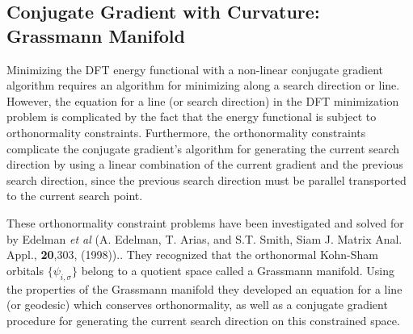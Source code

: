 \subsection{Conjugate Gradient with Curvature: Grassmann Manifold}
\label{sec:pspw_cgmanifold}

Minimizing the DFT energy functional with a non-linear conjugate 
gradient algorithm requires an algorithm for minimizing along a 
search direction or line.  However, the equation for a line 
(or search direction) in the DFT minimization problem is complicated 
by the fact that the energy functional is subject to orthonormality 
constraints. 
Furthermore, the orthonormality constraints complicate the
conjugate gradient's algorithm for generating the current search 
direction by using a linear combination of the current gradient and 
the previous search direction, since the previous search direction
must be parallel transported to the current search point.

These orthonormality constraint problems
have been investigated and solved for by Edelman {\it et al} 
(A. Edelman, T. Arias, and S.T. Smith, Siam J. Matrix Anal. Appl., 
\textbf{20},303, (1998))..  
They recognized that the orthonormal Kohn-Sham
orbitals $\{\psi_{i,\sigma}\}$ 
belong to a quotient space called a Grassmann manifold. 
Using the properties of the Grassmann manifold they
developed an equation for a line (or geodesic) which
conserves orthonormality, as well as 
a conjugate gradient procedure for generating the current search direction on this
constrained space.

